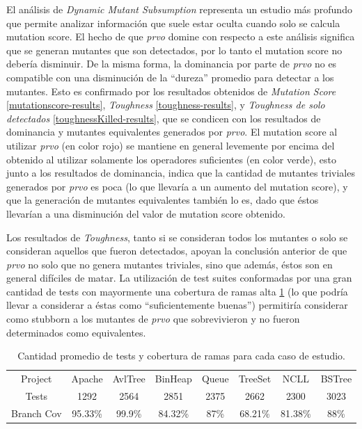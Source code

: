 El an\'alisis de \emph{Dynamic Mutant Subsumption} representa un estudio m\'as profundo que permite analizar informaci\'on que suele estar oculta cuando solo se calcula mutation score. El hecho de que \emph{prvo} domine con respecto a este an\'alisis significa que se generan mutantes que son detectados, por lo tanto el mutation score no deber\'ia disminuir. De la misma forma, la dominancia por parte de \emph{prvo} no es compatible con una disminuci\'on de la ``dureza'' promedio para detectar a los mutantes. Esto es confirmado por los resultados obtenidos de \emph{Mutation Score} \ref{mutationscore-results}, \emph{Toughness} \ref{toughness-results}, y \emph{Toughness de solo detectados} \ref{toughnessKilled-results}, que se condicen con los resultados de dominancia y mutantes equivalentes generados por \emph{prvo}. El mutation score al utilizar \emph{prvo} (en color rojo) se mantiene en general levemente por encima del obtenido al utilizar solamente los operadores suficientes (en color verde), esto junto a los resultados de dominancia, indica que la cantidad de mutantes triviales generados por \emph{prvo} es poca (lo que llevar\'ia a un aumento del mutation score), y que la generaci\'on de mutantes equivalentes tambi\'en lo es, dado que \'estos llevar\'ian a una disminuci\'on del valor de mutation score obtenido.

Los resultados de \emph{Toughness}, tanto si se consideran todos los mutantes o solo se consideran aquellos que fueron detectados, apoyan la conclusi\'on anterior de que \emph{prvo} no solo que no genera mutantes triviales, sino que adem\'as, \'estos son en general dif\'iciles de matar. La utilizaci\'on de test suites conformadas por una gran cantidad de tests con mayormente una cobertura de ramas alta \ref{testsAndCov-results} (lo que podr\'ia llevar a considerar a \'estas como ``suficientemente buenas'') permitir\'ia considerar como stubborn a los mutantes de \emph{prvo} que sobrevivieron y no fueron determinados como equivalentes.

\begin{table}[]
	\centering
	\small
	\begin{tabular}{|c|c|c|c|c|c|c|c|}
		\hline
		Project & Apache & AvlTree & BinHeap & Queue & TreeSet & NCLL & BSTree\\ \cline{1-1}
		Tests & 1292 & 2564 & 2851 & 2375 & 2662 & 2300 & 3023\\ \cline{1-1}
		Branch Cov & 95.33\% & 99.9\% & 84.32\% & 87\% & 68.21\% & 81.38\% & 88\%\\ \hline
	\end{tabular}
	\caption{Cantidad promedio de tests y cobertura de ramas para cada caso de estudio.}
	\label{testsAndCov-results}
\end{table}

